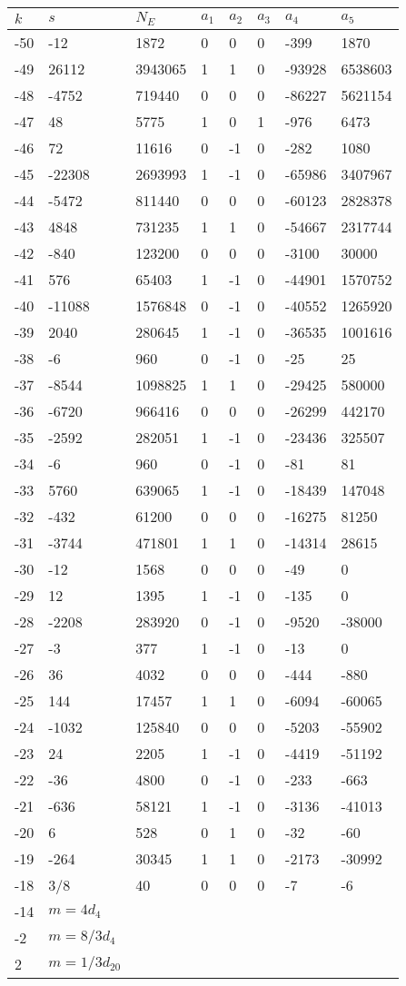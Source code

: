 \documentclass{amsart}
\begin{document}
\begin{longtable}{|l|l|l|lllll|}
\hline
$k$ & $s$ & $N_E$ & $a_1$ & $a_2$ & $a_3$ & $a_4$ & $a_5$\\
\hline
-50&-12&1872&0&0&0&-399&1870\\
-49&26112&3943065&1&1&0&-93928&6538603\\
-48&-4752&719440&0&0&0&-86227&5621154\\
-47&48&5775&1&0&1&-976&6473\\
-46&72&11616&0&-1&0&-282&1080\\
-45&-22308&2693993&1&-1&0&-65986&3407967\\
-44&-5472&811440&0&0&0&-60123&2828378\\
-43&4848&731235&1&1&0&-54667&2317744\\
-42&-840&123200&0&0&0&-3100&30000\\
-41&576&65403&1&-1&0&-44901&1570752\\
-40&-11088&1576848&0&-1&0&-40552&1265920\\
-39&2040&280645&1&-1&0&-36535&1001616\\
-38&-6&960&0&-1&0&-25&25\\
-37&-8544&1098825&1&1&0&-29425&580000\\
-36&-6720&966416&0&0&0&-26299&442170\\
-35&-2592&282051&1&-1&0&-23436&325507\\
-34&-6&960&0&-1&0&-81&81\\
-33&5760&639065&1&-1&0&-18439&147048\\
-32&-432&61200&0&0&0&-16275&81250\\
-31&-3744&471801&1&1&0&-14314&28615\\
-30&-12&1568&0&0&0&-49&0\\
-29&12&1395&1&-1&0&-135&0\\
-28&-2208&283920&0&-1&0&-9520&-38000\\
-27&-3&377&1&-1&0&-13&0\\
-26&36&4032&0&0&0&-444&-880\\
-25&144&17457&1&1&0&-6094&-60065\\
-24&-1032&125840&0&0&0&-5203&-55902\\
-23&24&2205&1&-1&0&-4419&-51192\\
-22&-36&4800&0&-1&0&-233&-663\\
-21&-636&58121&1&-1&0&-3136&-41013\\
-20&6&528&0&1&0&-32&-60\\
-19&-264&30345&1&1&0&-2173&-30992\\
-18&3/8&40&0&0&0&-7&-6\\
-14&$m=4d_{4}$&&\multicolumn{5}{c|}{}\\
-2&$m=8/3d_{4}$&&\multicolumn{5}{c|}{}\\
2&$m=1/3d_{20}$&&\multicolumn{5}{c|}{}\\
\hline
\end{longtable}
\end{document}
